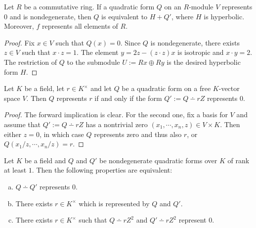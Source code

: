 \begin{proposition}\label{prop:sum_hyperbolic}
\leanok
{}
Let $R$ be a commutative ring. If a quadratic form $Q$ on an $R$-module $V$ represents $0$ and is nondegenerate, then $Q$ is equivalent to $H + Q'$, where $H$ is hyperbolic. Moreover, $f$ represents all elements of $R$.
\end{proposition}
\begin{proof}
Fix $x \in V$ such that $Q(x) = 0$. Since $Q$ is nondegenerate, there exists $z \in V$ such that $x \cdot z = 1$. The element $y = 2z - (z\cdot z)x$ is isotropic and $x \cdot y = 2$.
The restriction of $Q$ to the submodule $U := Rx \oplus Ry$ is the desired hyperbolic form $H$.
\end{proof}

\begin{corollary}\label{cor:represents_iff_sub_sub}
\leanok	
Let $K$ be a field, let $r \in K^\times$ and let $Q$ be a quadratic form on a free $K$-vector space $V$. Then $Q$ represents $r$ if and only if the form $Q' := Q \dotminus rZ$ represents $0$.
\end{corollary}
\begin{proof}
The forward implication is clear. For the second one, fix a basis for $V$ and assume that $Q' := Q \dotminus rZ$ has a nontrivial zero $(x_1, \cdots, x_n, z) \in V \times K$. Then either $z = 0$, in which case $Q$ represents zero and thus also $r$, or $Q(x_1/z, \cdots, x_n/z) = r$.
\end{proof}

\begin{corollary}\label{cor:prod_isotropic_iff}
\leanok
Let $K$ be a field and $Q$ and $Q'$ be nondegenerate quadratic forms over $K$ of rank at least $1$. Then the following properties are equivalent:
\begin{enumerate}[a)]
\item $Q \dotminus Q'$ represents $0$.
\item There exists $r \in K^\times$ which is represented by $Q$ and $Q'$.
\item There exists $r \in K^\times$ such that $Q \dotminus rZ^2$ and $Q' \dotminus rZ^2$ represent $0$.
\end{enumerate}
\end{corollary}

